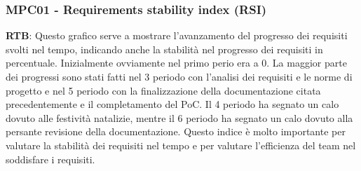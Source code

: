 \documentclass[10pt]{article}
\begin{document}
\begin{justify}
\subsubsection{MPC01 - Requirements stability index (RSI)}
\textbf{RTB}: Questo grafico serve a mostrare l'avanzamento del progresso dei requisiti svolti nel tempo, indicando anche la stabilità nel progresso dei requisiti in percentuale. Inizialmente ovviamente nel primo perio era a 0. La maggior parte dei progressi sono stati fatti nel 3 periodo con l'analisi dei requisiti e le norme di progetto e nel 5 periodo con la finalizzazione della documentazione citata precedentemente e il completamento del PoC. Il 4 periodo ha segnato un calo dovuto alle festività natalizie, mentre il 6 periodo ha segnato un calo dovuto alla persante revisione della documentazione. Questo indice è molto importante per valutare la stabilità dei requisiti nel tempo e per valutare l'efficienza del team nel soddisfare i requisiti.



\end{justify}
\end{document}
